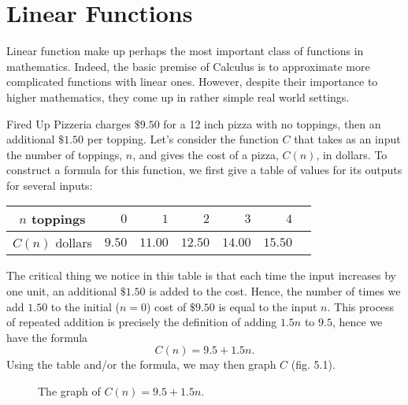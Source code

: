 \vfill

\pagebreak

\section{Linear Functions}

Linear function make up perhaps the most important class of functions in mathematics. Indeed, the basic premise of Calculus is to approximate more complicated functions with linear ones. However, despite their importance to higher mathematics, they come up in rather simple real world settings.

\begin{eg} Fired Up Pizzeria charges $\$ 9.50$ for a 12 inch pizza with no toppings, then an additional $\$ 1.50$ per topping. Let's consider the function $C$ that takes as an input the number of toppings, $n$, and gives the cost of a pizza, $C(n)$, in dollars. To construct a formula for this function, we first give a table of values for its outputs for several inputs:\\
\begin{center}
\begin{tabular}{c || r | r | r | r | r | r|}
\hline $n$ toppings & $0$ & $1$ & $2$ & $3$ & $4$ \\
\hline $C(n)$ dollars & $9.50$ & $11.00$ & $12.50$ & $14.00$ & $15.50$ \\
\hline
\end{tabular}
\end{center}
The critical thing we notice in this table is that each time the input increases by one unit, an additional $\$ 1.50$ is added to the cost. Hence, the number of times we add $1.50$ to the initial ($n=0$) cost of $\$ 9.50$ is equal to the input $n$. This process of repeated addition is precisely the definition of adding $1.5 n$ to $9.5$, hence we have the formula
\[
C(n) = 9.5 + 1.5 n.
\]
Using the table and/or the formula, we may then graph $C$ (fig. 5.1).

\par

\begin{figure}[h]
\centering
{} 
\caption{The graph of $C(n) = 9.5+1.5n$.}
\end{figure}




\end{eg}
